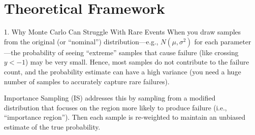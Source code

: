 \chapter{Theoretical Framework}
\label{ch:theory}

1. Why Monte Carlo Can Struggle With Rare Events
When you draw samples from the original (or “nominal”) distribution—e.g., 
$N(\mu, \sigma^2)$ for each parameter—the probability of seeing “extreme” samples that cause failure (like crossing 
$y < -1$) may be very small. Hence, most samples do not contribute to the failure count, and the probability estimate can have a high variance (you need a huge number of samples to accurately capture rare failures).

Importance Sampling (IS) addresses this by sampling from a modified distribution that focuses on the region more likely to produce failure (i.e., “importance region”). Then each sample is re-weighted to maintain an unbiased estimate of the true probability.